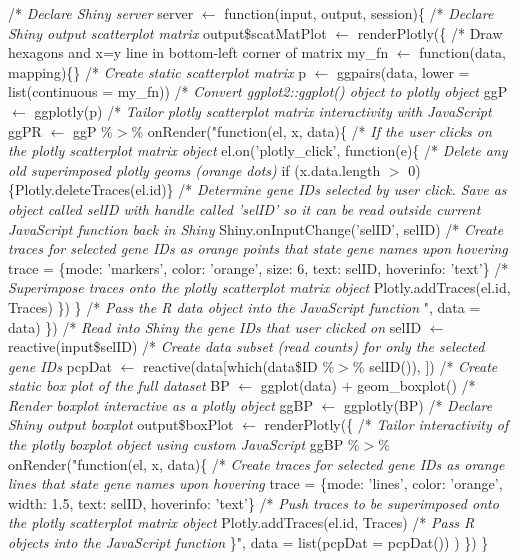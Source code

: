 \documentclass[parskip=full]{bmcart} %
\begin{document}
\begin{backmatter}
\begin{algorithm}[H]
/* \textit{Declare Shiny server}\;
server $\leftarrow$ function(input, output, session)\{\;
\BlankLine
\Indp/* \textit{Declare Shiny output scatterplot matrix}\;
output\$scatMatPlot $\leftarrow$ renderPlotly(\{\;
\BlankLine
\Indp\Indp/* Draw hexagons and x=y line in bottom-left corner of matrix\;
my\_fn $\leftarrow$ function(data, mapping)\{\}\;
\BlankLine
/* \textit{Create static scatterplot matrix}\;
p $\leftarrow$ ggpairs(data, lower = list(continuous = my\_fn))\;
\BlankLine
/* \textit{Convert ggplot2::ggplot() object to plotly object}\;
ggP $\leftarrow$ ggplotly(p)\;
\BlankLine
/* \textit{Tailor plotly scatterplot matrix interactivity with JavaScript}\;
ggPR $\leftarrow$ ggP \%$>$\% onRender("function(el, x, data)\{\;
\BlankLine
\Indp/* \textit{If the user clicks on the plotly scatterplot matrix object}\;
el.on('plotly\_click', function(e)\{\;
\BlankLine
\Indp/* \textit{Delete any old superimposed plotly geoms (orange dots)}\;
if (x.data.length $>$ 0)\{Plotly.deleteTraces(el.id)\}\;
\BlankLine
/* \textit{Determine gene IDs selected by user click. Save as object called selID with handle called 'selID' so it can be read outside current JavaScript function back in Shiny}\;
Shiny.onInputChange('selID', selID)\;
\BlankLine
/* \textit{Create traces for selected gene IDs as orange points that state gene names upon hovering}\;
trace = \{mode: 'markers', color: 'orange', size: 6, text: selID, hoverinfo: 'text'\}\;
\BlankLine
/* \textit{Superimpose traces onto the plotly scatterplot matrix object}\;
Plotly.addTraces(el.id, Traces)\;
\Indm\})\;
\Indm\}\;
\BlankLine
/* \textit{Pass the R data object into the JavaScript function}\;
", data = data)\;
\Indm\})\;
\BlankLine
/* \textit{Read into Shiny the gene IDs that user clicked on}\;
selID $\leftarrow$ reactive(input\$selID)\;
\BlankLine
/* \textit{Create data subset (read counts) for only the selected gene IDs}\;
pcpDat $\leftarrow$ reactive(data[which(data\$ID \%$>$\% selID()), ])\;
\BlankLine
/* \textit{Create static box plot of the full dataset}\;
BP $\leftarrow$ ggplot(data) $+$ geom\_boxplot()\;
\BlankLine
/* \textit{Render boxplot interactive as a plotly object}\;
ggBP $\leftarrow$ ggplotly(BP)\;
\BlankLine
/* \textit{Declare Shiny output boxplot}\;
output\$boxPlot $\leftarrow$ renderPlotly(\{\;
\BlankLine
\Indp/* \textit{Tailor interactivity of the plotly boxplot object using custom JavaScript}\;
ggBP \%$>$\% onRender("function(el, x, data)\{\;
\BlankLine
\Indp/* \textit{Create traces for selected gene IDs as orange lines that state gene names upon hovering}\;
trace = \{mode: 'lines', color: 'orange', width: 1.5, text: selID, hoverinfo: 'text'\}\;
\BlankLine
/* \textit{Push traces to be superimposed onto the plotly scatterplot matrix object}\;
Plotly.addTraces(el.id, Traces)\;
\BlankLine
/* \textit{Pass R objects into the JavaScript function}\;
\Indm\}", data = list(pcpDat = pcpDat())\;
\Indm)\;
\Indm\})\;
\Indm\}\;


\end{algorithm}
\end{backmatter}
\end{document}
